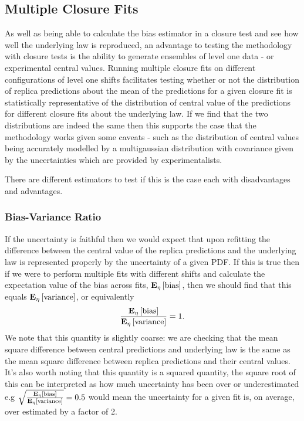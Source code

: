 \subsection{Multiple Closure Fits}

As well as being able to calculate the bias estimator in a closure test and
see how well the underlying law is reproduced, an advantage to testing the
methodology with closure tests is the ability to generate ensembles of
level one data - or experimental central values. Running multiple closure fits
on different configurations of level one shifts facilitates testing
whether or not the distribution of replica predictions about the mean of the
predictions for a given closure fit is statistically representative of the
distribution of central value of the predictions for different closure fits
about the underlying law. If we find that
the two distributions are indeed the same then this supports the case that
the methodology works given some caveats - such as the distribution of central
values being accurately modelled by a multigaussian distribution with
covariance given by the uncertainties which are provided by experimentalists.

There are different estimators to test if this
is the case each with disadvantages and advantages.

\subsubsection{Bias-Variance Ratio}

If the uncertainty is faithful then we would expect that upon refitting the
difference between the central value of the replica predictions and the underlying
law is represented properly by the uncertainty of a given PDF. If this is true
then if we were to perform multiple fits with different shifts and calculate the
expectation value of the bias across fits, $\mathbf{E}_{\eta}\left[ {\rm bias} \right]$, then we should find
that this equals $\mathbf{E}_{\eta}\left[ {\rm variance} \right]$, or equivalently
\begin{equation}
    \frac{\mathbf{E}_{\eta}\left[ {\rm bias} \right]}{\mathbf{E}_{\eta}\left[ {\rm variance} \right]} = 1.
\end{equation}
We note that this quantity is slightly coarse: we are checking that the mean square
difference between central predictions and underlying law is the same as the
mean square difference between replica predictions and their central values.
It's also worth noting that this quantity is a squared quantity, the square
root of this can be interpreted as how much uncertainty has been over or
underestimated e.g $\sqrt{\frac{\mathbf{E}_{\eta}\left[ {\rm bias} \right]}{\mathbf{E}_{\eta}\left[ {\rm variance} \right]}} = 0.5$ would
mean the uncertainty for a given fit is, on average, over estimated by a factor
of 2.

